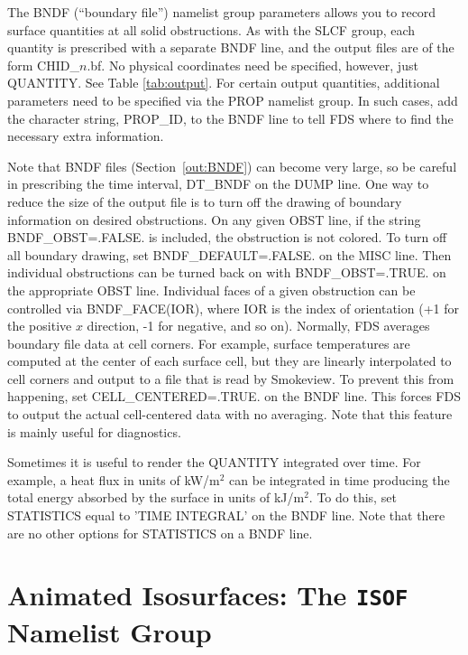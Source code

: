 \documentclass[11pt]{book}
\begin{document}
The {\ct BNDF} (``boundary file'') namelist group parameters allows you to record surface quantities at all solid obstructions. As with the {\ct SLCF} group, each quantity is prescribed with a separate {\ct BNDF} line, and the output files are of the form {\ct CHID\_$n$.bf}. No physical coordinates need be specified, however, just {\ct QUANTITY}. See Table \ref{tab:output}. For certain output quantities, additional parameters need to be specified via the {\ct PROP} namelist group. In such cases, add the character string, {\ct PROP\_ID}, to the {\ct BNDF} line to tell FDS where to find the necessary extra information.

Note that {\ct BNDF} files (Section~\ref{out:BNDF}) can become very large, so be careful in prescribing the time interval, {\ct DT\_BNDF} on the {\ct DUMP} line. One way to reduce the size of the output file is to turn off the drawing of boundary information on desired obstructions. On any given {\ct OBST} line, if the string {\ct BNDF\_OBST=.FALSE.} is included, the obstruction is not colored. To turn off all boundary drawing, set {\ct BNDF\_DEFAULT=.FALSE.} on the {\ct MISC} line. Then individual obstructions can be turned back on with {\ct BNDF\_OBST=.TRUE.} on the appropriate {\ct OBST} line. Individual faces of a given obstruction can be controlled via {\ct BNDF\_FACE(IOR)}, where {\ct IOR} is the index of orientation (+1 for the positive $x$ direction, -1 for negative, and so on). Normally, FDS averages boundary file data at cell corners. For example, surface temperatures are computed at the center of each surface cell, but they are linearly interpolated to cell corners and output to a file that is read by Smokeview. To prevent this from happening, set {\ct CELL\_CENTERED=.TRUE.} on the {\ct BNDF} line. This forces FDS to output the actual cell-centered data with no averaging. Note that this feature is mainly useful for diagnostics.

Sometimes it is useful to render the {\ct QUANTITY} integrated over time. For example, a heat flux in units of kW/m$^2$ can be integrated in time producing the total energy absorbed by the surface in units of kJ/m$^2$. To do this, set {\ct STATISTICS} equal to {\ct 'TIME INTEGRAL'} on the {\ct BNDF} line. Note that there are no other options for {\ct STATISTICS} on a {\ct BNDF} line.



\section{Animated Isosurfaces: The \texorpdfstring{{\tt ISOF}}{ISOF} Namelist Group}
\label{info:ISOF}
\end{document}
